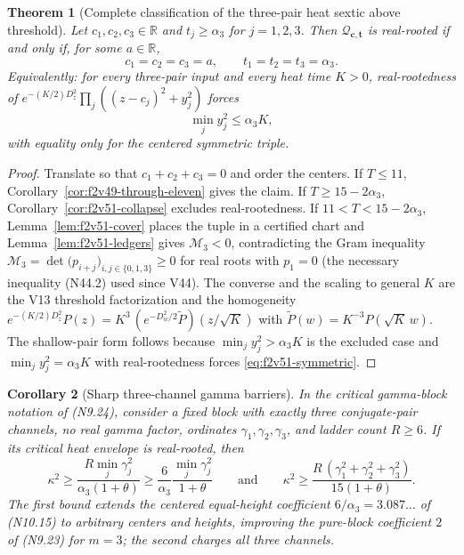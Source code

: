 \documentclass[11pt]{article}
\newtheorem{theorem}{Theorem}[section]
\newtheorem{corollary}[theorem]{Corollary}
\theoremstyle{definition}
\theoremstyle{remark}
\begin{document}
\begin{theorem}[Complete classification of the three-pair heat sextic above threshold]
\label{thm:f2v51-complete}
Let \(c_1,c_2,c_3\in\mathbb R\) and \(t_j\ge\alpha_3\) for
\(j=1,2,3\).  Then \(\mathcal Q_{\bm c,\bm t}\) is real-rooted if and
only if, for some \(a\in\mathbb R\),
\begin{equation}
 c_1=c_2=c_3=a,\qquad t_1=t_2=t_3=\alpha_3.
 \label{eq:f2v51-symmetric}
\end{equation}
Equivalently: for every three-pair input and every heat time \(K>0\),
real-rootedness of \(e^{-(K/2)D_z^2}\prod_j((z-c_j)^2+y_j^2)\) forces
\begin{equation}
 \boxed{\min_jy_j^2\le\alpha_3K,}
 \label{eq:f2v51-shallow}
\end{equation}
with equality only for the centered symmetric triple.
\end{theorem}

\begin{proof}
Translate so that \(c_1+c_2+c_3=0\) and order the centers.  If
\(T\le11\), Corollary~\ref{cor:f2v49-through-eleven} gives the claim.
If \(T\ge15-2\alpha_3\), Corollary~\ref{cor:f2v51-collapse} excludes
real-rootedness.  If \(11<T<15-2\alpha_3\), Lemma~\ref{lem:f2v51-cover}
places the tuple in a certified chart and Lemma~\ref{lem:f2v51-ledgers}
gives \(\mathcal M_3<0\), contradicting the Gram inequality
\(\mathcal M_3=\det\bigl(p_{i+j}\bigr)_{i,j\in\{0,1,3\}}\ge0\) for real
roots with \(p_1=0\) (the necessary inequality \textup{(N44.2)} used
since V44).  The converse and the scaling to general \(K\) are the V13
threshold factorization and the homogeneity
\(e^{-(K/2)D_z^2}P(z)=K^3\,(e^{-D_w^2/2}\tilde P)(z/\sqrt K)\) with
\(\tilde P(w)=K^{-3}P(\sqrt K\,w)\).  The shallow-pair form follows
because \(\min_jy_j^2>\alpha_3K\) is the excluded case and
\(\min_jy_j^2=\alpha_3K\) with real-rootedness forces
\eqref{eq:f2v51-symmetric}.
\end{proof}

\begin{corollary}[Sharp three-channel gamma barriers]
\label{cor:f2v51-gamma}
In the critical gamma-block notation of \textup{(N9.24)}, consider a
fixed block with exactly three conjugate-pair channels, no real gamma
factor, ordinates \(\gamma_1,\gamma_2,\gamma_3\), and ladder count
\(R\ge6\).  If its critical heat envelope is real-rooted, then
\begin{equation}
 \boxed{
 \kappa^2\ge\frac{R\min_j\gamma_j^2}{\alpha_3(1+\theta)}
 \ge\frac{6}{\alpha_3}\frac{\min_j\gamma_j^2}{1+\theta}}
 \qquad\text{and}\qquad
 \boxed{
 \kappa^2\ge\frac{R\,(\gamma_1^2+\gamma_2^2+\gamma_3^2)}{15(1+\theta)}.}
 \label{eq:f2v51-gamma}
\end{equation}
The first bound extends the centered equal-height coefficient
\(6/\alpha_3=3.087\ldots\) of \textup{(N10.15)} to arbitrary centers and
heights, improving the pure-block coefficient \(2\) of
\textup{(N9.23)} for \(m=3\); the second charges all three channels.
\end{corollary}
\end{document}
